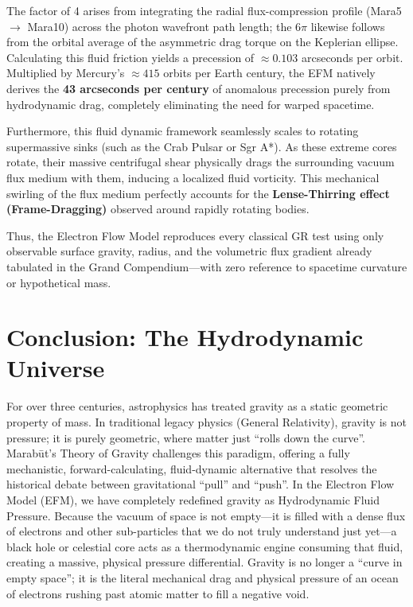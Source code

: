 \documentclass[11pt, a4paper]{article}
\begin{document}
  The factor of 4 arises from integrating the radial flux-compression profile (Mara5 $\rightarrow$ Mara10) across the photon wavefront path length; the $6\pi$ likewise follows from the orbital average of the asymmetric drag torque on the Keplerian ellipse. Calculating this fluid friction yields a precession of $\approx 0.103$ arcseconds per orbit. Multiplied by Mercury's $\approx 415$ orbits per Earth century, the EFM natively derives the \textbf{43 arcseconds per century} of anomalous precession purely from hydrodynamic drag, completely eliminating the need for warped spacetime.

  Furthermore, this fluid dynamic framework seamlessly scales to rotating supermassive sinks (such as the Crab Pulsar or Sgr A*). As these extreme cores rotate, their massive centrifugal shear physically drags the surrounding vacuum flux medium with them, inducing a localized fluid vorticity. This mechanical swirling of the flux medium perfectly accounts for the \textbf{Lense-Thirring effect (Frame-Dragging)} observed around rapidly rotating bodies.

  Thus, the Electron Flow Model reproduces every classical GR test using only observable surface gravity, radius, and the volumetric flux gradient already tabulated in the Grand Compendium---with zero reference to spacetime curvature or hypothetical mass.

\clearpage
\section{Conclusion: The Hydrodynamic Universe}

  For over three centuries, astrophysics has treated gravity as a static geometric property of mass. In traditional legacy physics (General Relativity), gravity is not pressure; it is purely geometric, where matter just ``rolls down the curve''. Marab\={u}t's Theory of Gravity challenges this paradigm, offering a fully mechanistic, forward-calculating, fluid-dynamic alternative that resolves the historical debate between gravitational ``pull'' and ``push''. In the Electron Flow Model (EFM), we have completely redefined gravity as Hydrodynamic Fluid Pressure. Because the vacuum of space is not empty---it is filled with a dense flux of electrons and other sub-particles that we do not truly understand just yet---a black hole or celestial core acts as a thermodynamic engine consuming that fluid, creating a massive, physical pressure differential. Gravity is no longer a ``curve in empty space''; it is the literal mechanical drag and physical pressure of an ocean of electrons rushing past atomic matter to fill a negative void.
\end{document}
